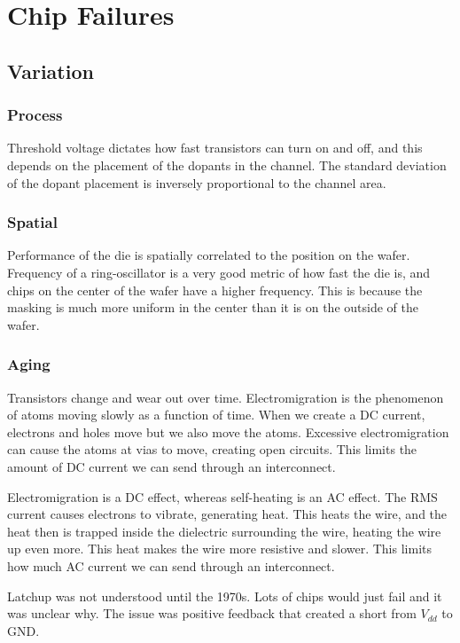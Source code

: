 \documentclass{article}
\begin{document}
\section{Chip Failures}

\subsection{Variation}

\subsubsection{Process}

Threshold voltage dictates how fast transistors can turn on and off, and this depends on the placement of the dopants in the channel. The standard deviation of the dopant placement is inversely proportional to the channel area.

\subsubsection{Spatial}

Performance of the die is spatially correlated to the position on the wafer. Frequency of a ring-oscillator is a very good metric of how fast the die is, and chips on the center of the wafer have a higher frequency. This is because the masking is much more uniform in the center than it is on the outside of the wafer.

\subsubsection{Aging}

Transistors change and wear out over time. Electromigration is the phenomenon of atoms moving slowly as a function of time. When we create a DC  current, electrons and holes move but we also move the atoms. Excessive electromigration can cause the atoms at vias to move, creating open circuits. This limits the amount of DC current we can send through an interconnect. 

Electromigration is a DC effect, whereas self-heating is an AC effect. The RMS current causes electrons to vibrate, generating heat. This heats the wire, and the heat then is trapped inside the dielectric surrounding the wire, heating the wire up even more. This heat makes the wire more resistive and slower. This limits how much AC current we can send through an interconnect.

Latchup was not understood until the 1970s. Lots of chips would just fail and it was unclear why. The issue was positive feedback that created a short from $V_{dd}$ to GND. 
\end{document}
